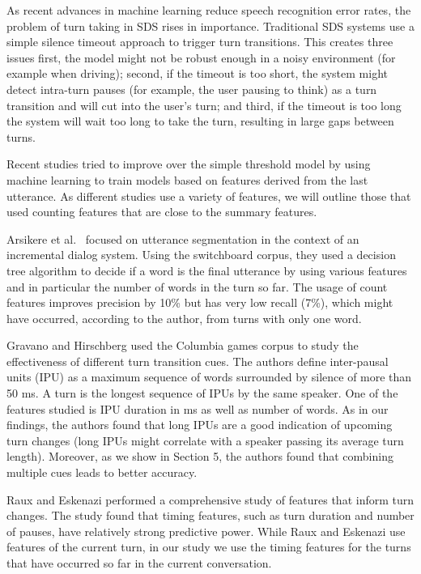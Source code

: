 
As recent advances in machine learning \cite{hinton2012deep} reduce speech recognition error rates, the problem of
turn taking in SDS rises in importance. Traditional SDS systems use a simple silence timeout approach to
trigger turn transitions. This creates three issues \cite{arsikere2015enhanced} first, the model might not be robust enough
in a noisy environment (for example when driving); second, if the timeout is too short, the system might
detect intra-turn pauses (for example, the user pausing to think) as a turn transition and will cut into the user's turn;
and third, if the timeout is too long the system will wait too long to take the turn, resulting in large gaps between turns.

Recent studies tried to improve over the simple threshold model by using machine learning to train models based on features derived from the last utterance. As different studies use a variety of features, we will outline those that used counting features that are close to the summary features.

Arsikere et al.~\cite{atterer2008towards} focused on utterance segmentation in the context of an incremental dialog system.
Using the switchboard corpus, they used a decision tree algorithm to decide if a word is the final utterance by using various features and in particular the number of words in the turn so far. The usage of count features improves precision by 10\% but has very low recall (7\%), which might have occurred, according to the author, from turns with only one word.

Gravano and Hirschberg \cite{gravano2011turn} used the Columbia games corpus to study the effectiveness of
different turn transition cues. The authors define inter-pausal units (IPU) as a maximum sequence of words surrounded
by silence of more than 50 ms. A turn is the longest sequence of IPUs by the same speaker.
One of the features studied is IPU duration in ms as well as number of words. As in our findings,
the authors found that long IPUs are a good indication of upcoming turn changes (long IPUs might correlate with a speaker passing
its average turn length). Moreover, as we show in Section 5, the authors found that combining multiple cues leads to better accuracy.

Raux and Eskenazi \cite{raux2012optimizing} performed a comprehensive study of features that inform turn changes. The study
found that timing features, such as turn duration and number of pauses, have relatively strong predictive power. While Raux and Eskenazi use features of the current turn, in our study we use the timing features for the turns that have occurred so far in the current conversation.

